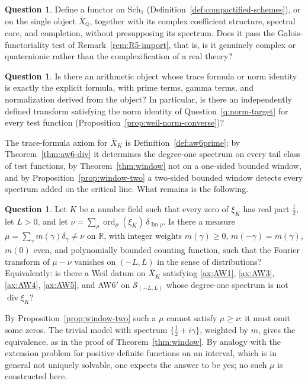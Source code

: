 \documentclass[11pt]{amsart}
\theoremstyle{plain}
\theoremstyle{definition}
\newtheorem{question}[theorem]{Question}
\theoremstyle{remark}
\numberwithin{equation}{section}
\newcommand{\R}{\mathbb{R}}
\newcommand{\Q}{\mathbb{Q}}
\newcommand{\Xbar}{\overline{X}}
\newcommand{\Schbar}{\overline{\mathrm{Sch}}}
\DeclareMathOperator{\divisor}{div}
\DeclareMathOperator{\Ima}{Im}
\DeclareMathOperator{\ord}{ord}
\renewcommand{\Im}{\Ima}
\begin{document}
\begin{question}\label{q:obl-object}
Define a functor on $\Schbar_1$
(Definition~\ref{def:compactified-schemes}), or on
the single object $\Xbar_\Q$, together with its complex coefficient
structure, spectral core, and completion, without presupposing its
spectrum. Does it pass the Galois-functoriality test of
Remark~\ref{rem:R5-import}, that is, is it genuinely complex or
quaternionic rather than the complexification of a real theory?
\end{question}

\begin{question}\label{q:obl-trace}
Is there an arithmetic object whose trace formula or norm identity is
exactly the explicit formula, with prime terms, gamma terms, and
normalization derived from the object? In particular, is there an
independently defined transform satisfying the norm identity of
Question~\ref{q:norm-target} for every test function
(Proposition~\ref{prop:weil-norm-converse})?
\end{question}

The trace-formula axiom for $\Xbar_K$ is
Definition~\ref{def:aw6prime}; by Theorem~\ref{thm:aw6-div} it
determines the degree-one spectrum on
every tail class of test functions, by Theorem~\ref{thm:window} not on
a one-sided bounded window, and by Proposition~\ref{prop:window-two} a
two-sided bounded window detects every spectrum added on the critical
line. What remains is the following.

\begin{question}\label{q:trace-axiom}
Let $K$ be a number field such that every zero of $\xi_K$ has real part
$\tfrac12$, let $L>0$, and let $\nu=\sum_\rho\ord_\rho(\xi_K)
\,\delta_{\Im\rho}$. Is there a measure $\mu=\sum_\gamma m(\gamma)
\delta_\gamma\ne\nu$ on $\R$, with integer weights $m(\gamma)\ge0$,
$m(-\gamma)=m(\gamma)$, $m(0)$ even, and polynomially bounded counting
function, such that the Fourier transform of $\mu-\nu$ vanishes on
$(-L,L)$ in the sense of distributions? Equivalently: is there a Weil
datum on $\Xbar_K$ satisfying \ref{ax:AW1}, \ref{ax:AW3},
\ref{ax:AW4}, \ref{ax:AW5}, and AW6$'$ on $\mathcal S_{(-L,L)}$ whose
degree-one spectrum is not $\divisor\xi_K$?
\end{question}

By Proposition~\ref{prop:window-two} such a $\mu$ cannot satisfy
$\mu\ge\nu$: it must omit some zeros. The trivial model with spectrum
$\{\tfrac12+i\gamma\}$, weighted by $m$, gives the equivalence, as in
the proof of Theorem~\ref{thm:window}. By analogy with the extension
problem for positive definite functions on an interval, which is in
general not uniquely solvable, one expects the answer to be yes; no
such $\mu$ is constructed here.
\end{document}
